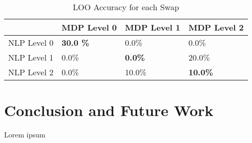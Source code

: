 \documentclass[conference]{IEEEtran}
\begin{document}
\begin{table}[h!]
\centering
\caption{LOO Accuracy for each Swap}
\label{my-label}
\begin{tabular}{l|l|l|l|}
\cline{2-4}
                                  & MDP Level 0 & MDP Level 1 & MDP Level 2 \\ \hline
\multicolumn{1}{|l|}{NLP Level 0} & \textbf{30.0 \%}      & 0.0\%       & 0.0\%       \\ \hline
\multicolumn{1}{|l|}{NLP Level 1} & 0.0\%       & \textbf{0.0\%}       & 20.0\%       \\ \hline
\multicolumn{1}{|l|}{NLP Level 2} & 0.0\%       & 10.0\%       & \textbf{10.0\%}       \\ \hline
\end{tabular}
\end{table}

\section{Conclusion and Future Work}
\label{sec:conclusion}

Lorem ipsum





\end{document}
